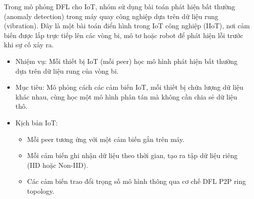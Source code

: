 \hspace{0.6cm}Trong mô phỏng DFL cho IoT, nhóm sử dụng bài toán phát hiện bất thường (anomaly detection) trong máy quay công nghiệp dựa trên dữ liệu rung (vibration). Đây là một bài toán điển hình trong IoT công nghiệp (IIoT), nơi cảm biến được lắp trực tiếp lên các vòng bi, mô tơ hoặc robot để phát hiện lỗi trước khi sự cố xảy ra.
\begin{itemize}
    \item Nhiệm vụ: Mỗi thiết bị IoT (mỗi peer) học mô hình phát hiện bất thường dựa trên dữ liệu rung của vòng bi.
    \item Mục tiêu: Mô phỏng cách các cảm biến IoT, mỗi thiết bị chứa lượng dữ liệu khác nhau, cùng học một mô hình phân tán mà không cần chia sẻ dữ liệu thô.
    \item Kịch bản IoT:   
    \begin{itemize}
        \item Mỗi peer tương ứng với một cảm biến gắn trên máy.         
        \item Mỗi cảm biến ghi nhận dữ liệu theo thời gian, tạo ra tập dữ liệu riêng (IID hoặc Non-IID).        
        \item Các cảm biến trao đổi trọng số mô hình thông qua cơ chế DFL P2P ring topology.
    \end{itemize}
\end{itemize}